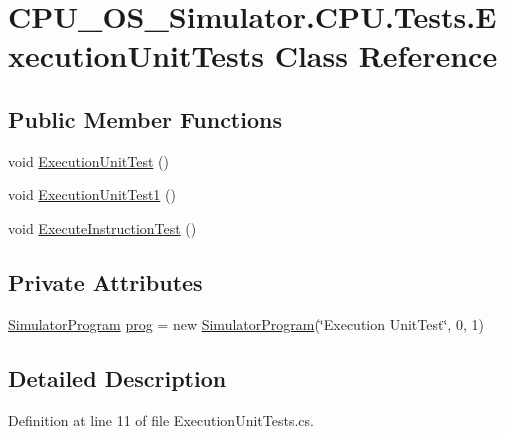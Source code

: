 \hypertarget{class_c_p_u___o_s___simulator_1_1_c_p_u_1_1_tests_1_1_execution_unit_tests}{}\section{C\+P\+U\+\_\+\+O\+S\+\_\+\+Simulator.\+C\+P\+U.\+Tests.\+Execution\+Unit\+Tests Class Reference}
\label{class_c_p_u___o_s___simulator_1_1_c_p_u_1_1_tests_1_1_execution_unit_tests}
\subsection*{Public Member Functions}
\begin{DoxyCompactItemize}
\item 
void \hyperlink{class_c_p_u___o_s___simulator_1_1_c_p_u_1_1_tests_1_1_execution_unit_tests_aaf269c98f9007b95804b7968a60824f4}{Execution\+Unit\+Test} ()
\item 
void \hyperlink{class_c_p_u___o_s___simulator_1_1_c_p_u_1_1_tests_1_1_execution_unit_tests_a1fbe0d28afb517a2d633d88189f01b68}{Execution\+Unit\+Test1} ()
\item 
void \hyperlink{class_c_p_u___o_s___simulator_1_1_c_p_u_1_1_tests_1_1_execution_unit_tests_a5316a7da14de055e3c3d06ca62832f03}{Execute\+Instruction\+Test} ()
\end{DoxyCompactItemize}
\subsection*{Private Attributes}
\begin{DoxyCompactItemize}
\item 
\hyperlink{class_c_p_u___o_s___simulator_1_1_c_p_u_1_1_simulator_program}{Simulator\+Program} \hyperlink{class_c_p_u___o_s___simulator_1_1_c_p_u_1_1_tests_1_1_execution_unit_tests_ac62f9fcd8038819097fcd0d32376c182}{prog} = new \hyperlink{class_c_p_u___o_s___simulator_1_1_c_p_u_1_1_simulator_program}{Simulator\+Program}(\char`\"{}Execution Unit\+Test\char`\"{}, 0, 1)
\end{DoxyCompactItemize}


\subsection{Detailed Description}


Definition at line 11 of file Execution\+Unit\+Tests.\+cs.



